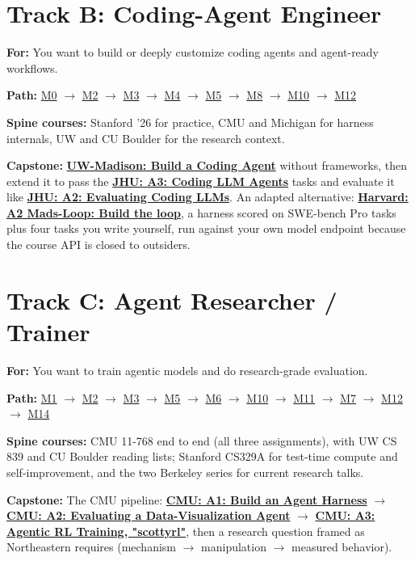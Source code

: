 \documentclass[10pt,oneside]{report}
\begin{document}
\section{Track B: Coding-Agent Engineer}
\textbf{For:} You want to build or deeply customize coding agents and agent-ready workflows.\par
\textbf{Path:} \hyperlink{mod-SETUP}{M0} $\rightarrow$ \hyperlink{mod-ARCH}{M2} $\rightarrow$ \hyperlink{mod-TOOL}{M3} $\rightarrow$ \hyperlink{mod-MCP}{M4} $\rightarrow$ \hyperlink{mod-MEM}{M5} $\rightarrow$ \hyperlink{mod-CODE}{M8} $\rightarrow$ \hyperlink{mod-EVAL}{M10} $\rightarrow$ \hyperlink{mod-SAFE}{M12}\par
\textbf{Spine courses:} Stanford '26 for practice, CMU and Michigan for harness internals, UW and CU Boulder for the research context.\par
\textbf{Capstone:} \hyperlink{asg-UW-1}{\textbf{UW-Madison: Build a Coding Agent}} without frameworks, then extend it to pass the \hyperlink{asg-JHU-3}{\textbf{JHU: A3: Coding LLM Agents}} tasks and evaluate it like \hyperlink{asg-JHU-2}{\textbf{JHU: A2: Evaluating Coding LLMs}}. An adapted alternative: \hyperlink{asg-HARV-2}{\textbf{Harvard: A2 Mads-Loop: Build the loop}}, a harness scored on SWE-bench Pro tasks plus four tasks you write yourself, run against your own model endpoint because the course API is closed to outsiders.\par
\section{Track C: Agent Researcher / Trainer}
\textbf{For:} You want to train agentic models and do research-grade evaluation.\par
\textbf{Path:} \hyperlink{mod-FND}{M1} $\rightarrow$ \hyperlink{mod-ARCH}{M2} $\rightarrow$ \hyperlink{mod-TOOL}{M3} $\rightarrow$ \hyperlink{mod-MEM}{M5} $\rightarrow$ \hyperlink{mod-RSN}{M6} $\rightarrow$ \hyperlink{mod-EVAL}{M10} $\rightarrow$ \hyperlink{mod-TRAIN}{M11} $\rightarrow$ \hyperlink{mod-MULTI}{M7} $\rightarrow$ \hyperlink{mod-SAFE}{M12} $\rightarrow$ \hyperlink{mod-APP}{M14}\par
\textbf{Spine courses:} CMU 11-768 end to end (all three assignments), with UW CS 839 and CU Boulder reading lists; Stanford CS329A for test-time compute and self-improvement, and the two Berkeley series for current research talks.\par
\textbf{Capstone:} The CMU pipeline: \hyperlink{asg-CMU-1}{\textbf{CMU: A1: Build an Agent Harness}} $\rightarrow$ \hyperlink{asg-CMU-2}{\textbf{CMU: A2: Evaluating a Data-Visualization Agent}} $\rightarrow$ \hyperlink{asg-CMU-3}{\textbf{CMU: A3: Agentic RL Training, "scottyrl"}}, then a research question framed as Northeastern requires (mechanism $\rightarrow$ manipulation $\rightarrow$ measured behavior).\par
\end{document}
